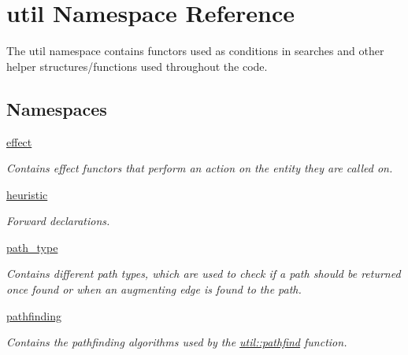 \hypertarget{namespaceutil}{}\section{util Namespace Reference}
\label{namespaceutil}


The util namespace contains functors used as conditions in searches and other helper structures/functions used throughout the code.  


\subsection*{Namespaces}
\begin{DoxyCompactItemize}
\item 
 \hyperlink{namespaceutil_1_1effect}{effect}
\begin{DoxyCompactList}\small\item\em Contains effect functors that perform an action on the entity they are called on. \end{DoxyCompactList}\item 
 \hyperlink{namespaceutil_1_1heuristic}{heuristic}
\begin{DoxyCompactList}\small\item\em Forward declarations. \end{DoxyCompactList}\item 
 \hyperlink{namespaceutil_1_1path__type}{path\+\_\+type}
\begin{DoxyCompactList}\small\item\em Contains different path types, which are used to check if a path should be returned once found or when an augmenting edge is found to the path. \end{DoxyCompactList}\item 
 \hyperlink{namespaceutil_1_1pathfinding}{pathfinding}
\begin{DoxyCompactList}\small\item\em Contains the pathfinding algorithms used by the \hyperlink{namespaceutil_a1d8b1dc5bfaf22eb62b03173a6ff9b56}{util\+::pathfind} function. \end{DoxyCompactList}\end{DoxyCompactItemize}
